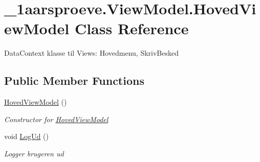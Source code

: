 \hypertarget{class__1aarsproeve_1_1_view_model_1_1_hoved_view_model}{}\section{\+\_\+1aarsproeve.\+View\+Model.\+Hoved\+View\+Model Class Reference}
\label{class__1aarsproeve_1_1_view_model_1_1_hoved_view_model}


Data\+Context klasse til Views\+: Hovedmenu, Skriv\+Besked  


\subsection*{Public Member Functions}
\begin{DoxyCompactItemize}
\item 
\hyperlink{class__1aarsproeve_1_1_view_model_1_1_hoved_view_model_ad1f93a3cec1e8f3b2272a4e92adb2815}{Hoved\+View\+Model} ()
\begin{DoxyCompactList}\small\item\em Constructor for \hyperlink{class__1aarsproeve_1_1_view_model_1_1_hoved_view_model}{Hoved\+View\+Model} \end{DoxyCompactList}\item 
void \hyperlink{class__1aarsproeve_1_1_view_model_1_1_hoved_view_model_ab9eeed2082ee607e4243559b1750eb8e}{Log\+Ud} ()
\begin{DoxyCompactList}\small\item\em Logger brugeren ud \end{DoxyCompactList}\end{DoxyCompactItemize}
